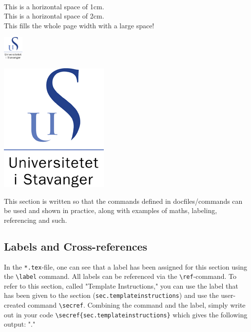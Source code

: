 \\
This \hspace{1cm} is a horizontal space of 1cm.\\
This \hspace{2cm} is a horizontal space of 2cm.\\
This fills the whole page width \hfill with a large space!\\
\begin{center}\includegraphics[width=1cm]{figures/uis_logo}\end{center}
\begin{center}\includegraphics[scale=0.5]{figures/uis_logo}\end{center}
\break

This section is written so that the commands defined in docfiles/commands can be used and shown in practice, along with examples of maths, labeling, referencing and such. 

\subsection{Labels and Cross-references}\label{sec.labels}

In the \verb|*.tex|-file, one can see that a label has been assigned for this section using the \verb|\label| command. All labels can be referenced via the \verb|\ref|-command. To refer to this section, called "Template Instructions," you can use the label that has been given to the section (\verb|sec.templateinstructions|) and use the user-created command \verb|\secref|. Combining the command and the label, simply write out in your code \verb|\secref{sec.templateinstructions}| which gives the following output: "."

